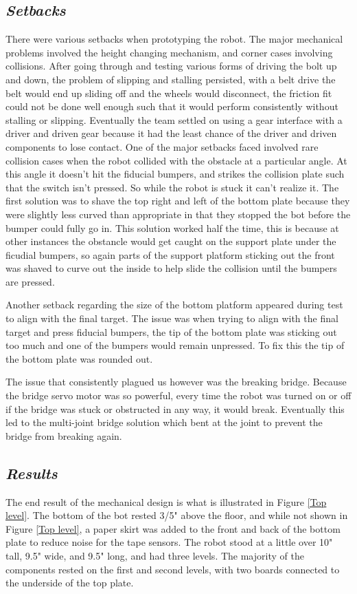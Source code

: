 \documentclass[]{article}
\begin{document}
\subsection*{\textit{Setbacks}}
There were various setbacks when prototyping the robot. The major mechanical problems involved the height changing mechanism, and corner cases involving collisions. After going through and testing various forms of driving the bolt up and down, the problem of slipping and stalling persisted, with a belt drive the belt would end up sliding off and the wheels would disconnect, the friction fit could not be done well enough such that it would perform consistently without stalling or slipping. Eventually the team settled on using a gear interface with a driver and driven gear because it had the least chance of the driver and driven components to lose contact.
One of the major setbacks faced involved rare collision cases when the robot collided with the obstacle at a particular angle. At this angle it doesn't hit the fiducial bumpers, and strikes the collision plate such that the switch isn't pressed. So while the robot is stuck it can't realize it. The first solution was to shave the top right and left of the bottom plate because they were slightly less curved than appropriate in that they stopped the bot before the bumper could fully go in. This solution worked half the time, this is because at other instances the obstancle would get caught on the support plate under the ficudial bumpers, so again parts of the support platform sticking out the front was shaved to curve out the inside to help slide the collision until the bumpers are pressed. 

Another setback regarding the size of the bottom platform appeared during test to align with the final target. The issue was when trying to align with the final target and press fiducial bumpers, the tip of the bottom plate was sticking out too much and one of the bumpers would remain unpressed. To fix this the tip of the bottom plate was rounded out.

The issue that consistently plagued us however was the breaking bridge. Because the bridge servo motor was so powerful, every time the robot was turned on or off if the bridge was stuck or obstructed in any way, it would break. Eventually this led to the multi-joint bridge solution which bent at the joint to prevent the bridge from breaking again.

\subsection*{\textit{Results}}
The end result of the mechanical design is what is illustrated in Figure \ref{Top level}. The bottom of the bot rested 3/5" above the floor, and while not shown in Figure \ref{Top level}, a paper skirt was added to the front and back of the bottom plate to reduce noise for the tape sensors. The robot stood at a little over 10" tall, 9.5" wide, and 9.5" long, and had three levels. The majority of the components rested on the first and second levels, with two boards connected to the underside of the top plate. 
\end{document}
